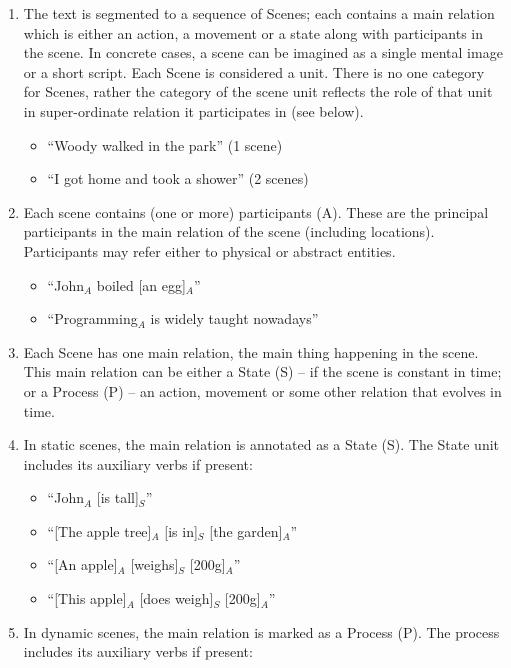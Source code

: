 \documentclass[11pt]{article}
\begin{document}
\begin{enumerate}
\item
The text is segmented to a sequence of Scenes; each contains a main relation which is either an action, a movement or a state along with participants in the scene. In concrete cases, a scene can be imagined as a single mental image or a short script. Each Scene is considered a unit. There is no one category for Scenes, rather the category of the scene unit reflects the role of that unit in super-ordinate relation it participates in (see below).

\begin{itemize}
\item
``Woody walked in the park'' (1 scene)
\item
``I got home and took a shower'' (2 scenes)
\end{itemize}

\item
Each scene contains (one or more) participants (A). These are the principal participants in the main relation of the scene (including locations). Participants may refer either to physical or abstract entities.

\begin{itemize}
\item
``John$_A$ boiled [an egg]$_A$''
\item
``Programming$_A$ is widely taught nowadays''
\end{itemize}

\item
Each Scene has one main relation, the main thing happening in the scene. This main relation can be either a State (S) – if the scene is constant in time; or a Process (P) – an action, movement or some other relation that evolves in time.

\item
In static scenes, the main relation is annotated as a State (S). The State unit includes its auxiliary verbs if present:

\begin{itemize}
\item
``John$_A$ [is tall]$_S$''
\item
``[The apple tree]$_A$ [is in]$_S$ [the garden]$_A$''
\item
``[An apple]$_A$ [weighs]$_S$ [200g]$_A$''
\item
``[This apple]$_A$ [does weigh]$_S$ [200g]$_A$''
\end{itemize}

\item
In dynamic scenes, the main relation is marked as a Process (P). The process includes its auxiliary verbs if present:


\end{enumerate}
\end{document}
